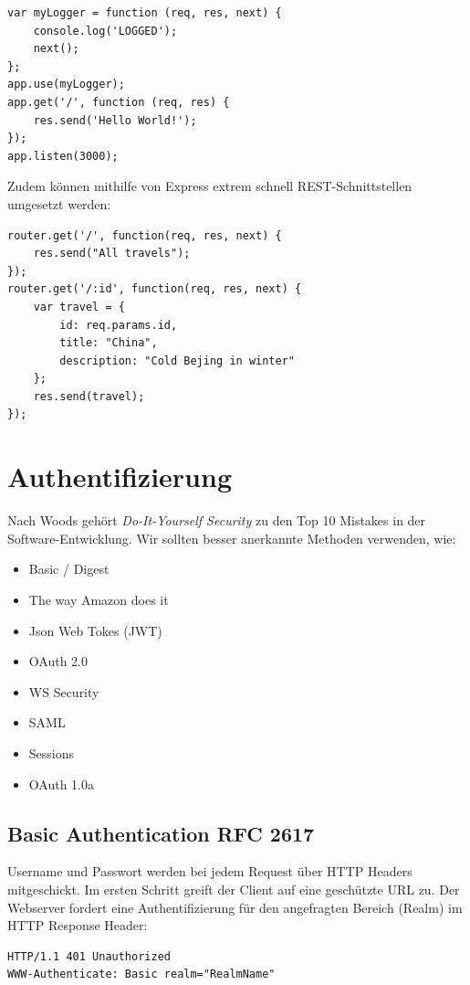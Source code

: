 \begin{lstlisting}[caption=Loggen jedes Requests]
var myLogger = function (req, res, next) {
	console.log('LOGGED');
	next();
};
app.use(myLogger);
app.get('/', function (req, res) {
	res.send('Hello World!');
});
app.listen(3000);
\end{lstlisting}

Zudem können mithilfe von Express extrem schnell REST-Schnittstellen umgesetzt werden:

\begin{lstlisting}[caption=REST mit Express]
router.get('/', function(req, res, next) {
	res.send("All travels");
});
router.get('/:id', function(req, res, next) {
	var travel = {
		id: req.params.id,
		title: "China",
		description: "Cold Bejing in winter"
	};
	res.send(travel);
});
\end{lstlisting}

\section{Authentifizierung}

Nach Woods gehört \textit{Do-It-Yourself Security} zu den Top 10 Mistakes in der Software-Entwicklung. Wir sollten besser anerkannte Methoden verwenden, wie:
\begin{itemize}
	\item Basic / Digest
	\item The way Amazon does it
	\item Json Web Tokes (JWT)
	\item OAuth 2.0
	\item WS Security
	\item SAML
	\item Sessions
	\item OAuth 1.0a
\end{itemize}

\subsection{Basic Authentication RFC 2617}
Username und Passwort werden bei jedem Request über HTTP Headers mitgeschickt. Im ersten Schritt greift der Client auf eine geschützte URL zu. Der Webserver fordert eine Authentifizierung für den angefragten Bereich (Realm) im HTTP Response Header:

\begin{lstlisting}[caption=HTTP Response Header]
HTTP/1.1 401 Unauthorized
WWW-Authenticate: Basic realm="RealmName"
\end{lstlisting}

